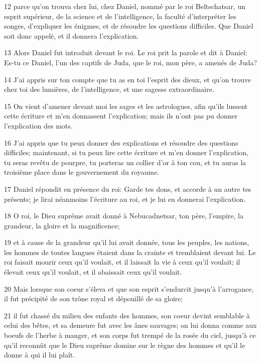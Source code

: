 \par 12 parce qu'on trouva chez lui, chez Daniel, nommé par le roi Beltschatsar, un esprit supérieur, de la science et de l'intelligence, la faculté d'interpréter les songes, d'expliquer les énigmes, et de résoudre les questions difficiles. Que Daniel soit donc appelé, et il donnera l'explication.
\par 13 Alors Daniel fut introduit devant le roi. Le roi prit la parole et dit à Daniel: Es-tu ce Daniel, l'un des captifs de Juda, que le roi, mon père, a amenés de Juda?
\par 14 J'ai appris sur ton compte que tu as en toi l'esprit des dieux, et qu'on trouve chez toi des lumières, de l'intelligence, et une sagesse extraordinaire.
\par 15 On vient d'amener devant moi les sages et les astrologues, afin qu'ils lussent cette écriture et m'en donnassent l'explication; mais ils n'ont pas pu donner l'explication des mots.
\par 16 J'ai appris que tu peux donner des explications et résoudre des questions difficiles; maintenant, si tu peux lire cette écriture et m'en donner l'explication, tu seras revêtu de pourpre, tu porteras un collier d'or à ton cou, et tu auras la troisième place dans le gouvernement du royaume.
\par 17 Daniel répondit en présence du roi: Garde tes dons, et accorde à un autre tes présents; je lirai néanmoins l'écriture au roi, et je lui en donnerai l'explication.
\par 18 O roi, le Dieu suprême avait donné à Nebucadnetsar, ton père, l'empire, la grandeur, la gloire et la magnificence;
\par 19 et à cause de la grandeur qu'il lui avait donnée, tous les peuples, les nations, les hommes de toutes langues étaient dans la crainte et tremblaient devant lui. Le roi faisait mourir ceux qu'il voulait, et il laissait la vie à ceux qu'il voulait; il élevait ceux qu'il voulait, et il abaissait ceux qu'il voulait.
\par 20 Mais lorsque son coeur s'éleva et que son esprit s'endurcit jusqu'à l'arrogance, il fut précipité de son trône royal et dépouillé de sa gloire;
\par 21 il fut chassé du milieu des enfants des hommes, son coeur devint semblable à celui des bêtes, et sa demeure fut avec les ânes sauvages; on lui donna comme aux boeufs de l'herbe à manger, et son corps fut trempé de la rosée du ciel, jusqu'à ce qu'il reconnût que le Dieu suprême domine sur le règne des hommes et qu'il le donne à qui il lui plaît.
